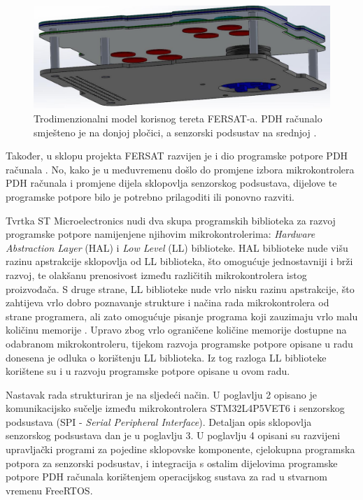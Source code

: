     \begin{figure}[htb]
        \centering
        \includegraphics[width=\textwidth]{slike/fersat_3d.png}
        \caption{Trodimenzionalni model korisnog tereta FERSAT-a. PDH računalo smješteno je na donjoj pločici, a senzorski podsustav na srednjoj \cite{zavrsni_filip_juric}.}
        \label{fig:fersat_3d}
    \end{figure}

    Također, u sklopu projekta FERSAT razvijen je i dio programske potpore PDH računala \cite{diplomski_goran_petrak}. No, kako je u međuvremenu došlo do promjene izbora mikrokontrolera PDH računala i promjene dijela sklopovlja senzorskog podsustava, dijelove te programske potpore bilo je potrebno prilagoditi ili ponovno razviti.

    Tvrtka ST Microelectronics nudi dva skupa programskih biblioteka za razvoj programske potpore namijenjene njihovim mikrokontrolerima: \textit{Hardware Abstraction Layer} (HAL) i \textit{Low Level} (LL) biblioteke. HAL biblioteke nude višu razinu apstrakcije sklopovlja od LL biblioteka, što omogućuje jednostavniji i brži razvoj, te olakšanu prenosivost između različitih mikrokontrolera istog proizvođača. S druge strane, LL biblioteke nude vrlo nisku razinu apstrakcije, što zahtijeva vrlo dobro poznavanje strukture i načina rada mikrokontrolera od strane programera, ali zato omogućuje pisanje programa koji zauzimaju vrlo malu količinu memorije \cite{stm_hal_ll}. Upravo zbog vrlo ograničene količine memorije dostupne na odabranom mikrokontroleru, tijekom razvoja programske potpore opisane u radu \cite{diplomski_goran_petrak} donesena je odluka o korištenju LL biblioteka. Iz tog razloga LL biblioteke korištene su i u razvoju programske potpore opisane u ovom radu.

    Nastavak rada strukturiran je na sljedeći način. U poglavlju 2 opisano je komunikacijsko sučelje između mikrokontrolera STM32L4P5VET6 i senzorskog podsustava (SPI - \textit{Serial Peripheral Interface}). Detaljan opis sklopovlja senzorskog podsustava dan je u poglavlju 3. U poglavlju 4 opisani su razvijeni upravljački programi za pojedine sklopovske komponente, cjelokupna programska potpora za senzorski podsustav, i integracija s ostalim dijelovima programske potpore PDH računala korištenjem operacijskog sustava za rad u stvarnom vremenu FreeRTOS.
